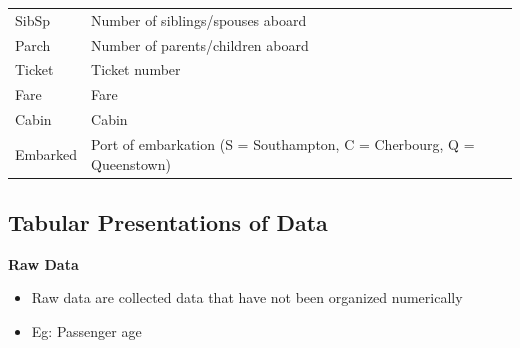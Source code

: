 \documentclass[]{book}
\providecommand{\tightlist}{%
  \setlength{\itemsep}{0pt}\setlength{\parskip}{0pt}}
\begin{document}
\begin{longtable}[]{@{}ll@{}}
\begin{minipage}[t]{0.49\columnwidth}
SibSp\strut
\end{minipage} & \begin{minipage}[t]{0.45\columnwidth}\raggedright
Number of siblings/spouses aboard\strut
\end{minipage}\tabularnewline
\begin{minipage}[t]{0.49\columnwidth}\raggedright
Parch\strut
\end{minipage} & \begin{minipage}[t]{0.45\columnwidth}\raggedright
Number of parents/children aboard\strut
\end{minipage}\tabularnewline
\begin{minipage}[t]{0.49\columnwidth}\raggedright
Ticket\strut
\end{minipage} & \begin{minipage}[t]{0.45\columnwidth}\raggedright
Ticket number\strut
\end{minipage}\tabularnewline
\begin{minipage}[t]{0.49\columnwidth}\raggedright
Fare\strut
\end{minipage} & \begin{minipage}[t]{0.45\columnwidth}\raggedright
Fare\strut
\end{minipage}\tabularnewline
\begin{minipage}[t]{0.49\columnwidth}\raggedright
Cabin\strut
\end{minipage} & \begin{minipage}[t]{0.45\columnwidth}\raggedright
Cabin\strut
\end{minipage}\tabularnewline
\begin{minipage}[t]{0.49\columnwidth}\raggedright
Embarked\strut
\end{minipage} & \begin{minipage}[t]{0.45\columnwidth}\raggedright
Port of embarkation (S = Southampton, C = Cherbourg, Q = Queenstown)\strut
\end{minipage}\tabularnewline
\bottomrule
\end{longtable}

\hypertarget{tabular-presentations-of-data}{%
\subsection{Tabular Presentations of Data}\label{tabular-presentations-of-data}}

\textbf{Raw Data}

\begin{itemize}
\tightlist
\item
  Raw data are collected data that have not been organized numerically
\item
  Eg: Passenger age
\end{itemize}
\end{document}
